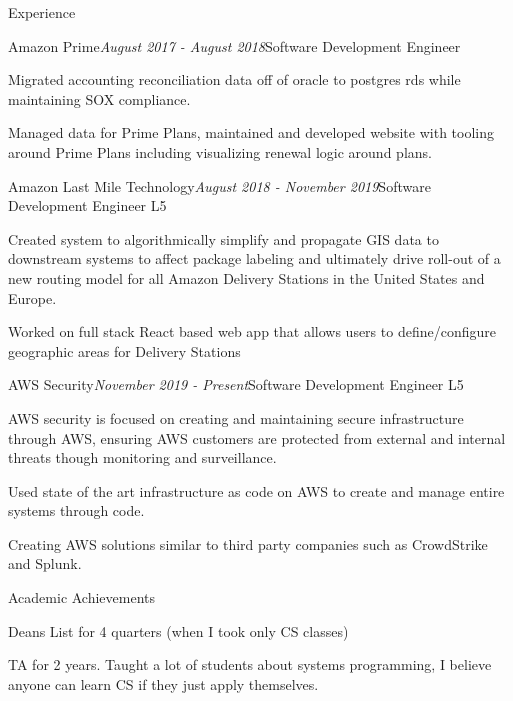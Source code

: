 \documentclass{resume} %
\begin{document}
\begin{rSection}{Experience}

\begin{rSubsection}{Amazon Prime}{\em August 2017 - August 2018}{Software Development Engineer}{}
\item Migrated accounting reconciliation data off of oracle to postgres rds while maintaining SOX compliance.
\item Managed data for Prime Plans, maintained and developed website with tooling around Prime Plans including visualizing renewal logic around plans. 
\end{rSubsection}


\begin{rSubsection}{Amazon Last Mile Technology}{\em August 2018 - November 2019}{Software Development Engineer L5}{}
\item Created system to algorithmically simplify and propagate GIS data to downstream systems to affect package labeling and ultimately drive roll-out of a new routing model for all Amazon Delivery Stations in the United States and Europe.
\item Worked on full stack React based web app that allows users to define/configure geographic areas for Delivery Stations
\end{rSubsection}

\begin{rSubsection}{AWS Security}{\em November 2019 - Present}{Software Development Engineer L5}{}
\item AWS security is focused on creating and maintaining secure infrastructure through AWS, ensuring AWS customers are protected from external and internal threats though monitoring and surveillance.
\item Used state of the art infrastructure as code on AWS to create and manage entire systems through code.
\item Creating AWS solutions similar to third party companies such as CrowdStrike and Splunk.
\end{rSubsection}
\end{rSection}


\begin{rSection}{Academic Achievements} \itemsep -2pt
\item Deans List for 4 quarters (when I took only CS classes)
\item TA for 2 years. Taught a lot of students about systems programming, I believe anyone can learn CS if they just apply themselves.
\end{rSection}
\end{document}
